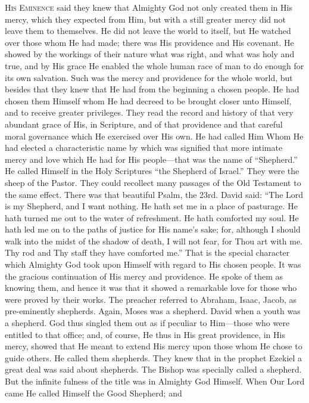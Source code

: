 H\textsc{is} E\textsc{minence}
said they knew that Almighty God not only created them in His mercy,
which they expected from Him, but with a still greater mercy did not
leave them to themselves. He did not leave the world to itself, but He
watched over those whom He had made; there was His providence and His
covenant. He showed by the workings of their nature what was right,
and what was holy and true, and by His grace He enabled the whole
human race of man to do enough for its own salvation. Such was the
mercy and providence for the whole world, but besides that they knew
that He had from the beginning a chosen people. He had chosen them
Himself whom He had decreed to be brought closer unto Himself, and to
receive greater privileges. They read the record and history of that
very abundant grace of His, in Scripture, and of that providence and
that careful moral governance which He exercised over His own. He had
called Him Whom He had elected a characteristic name by which was
signified that more intimate mercy and love which He had for His
people—that was the name of ``Shepherd.'' He called Himself in the
Holy Scriptures ``the Shepherd of Israel.'' They were the sheep of the
Pastor. They could recollect many passages of the Old Testament to the
same effect. There was that beautiful Psalm, the 23rd. David said: ``The
Lord is my Shepherd, and I want nothing. He hath set me in a place of
pasturage. He hath turned me out to the water of refreshment. He hath
comforted my soul. He hath led me on to the paths of justice for His
name's sake; for, although I should walk into the midst of the shadow
of death, I will not fear, for Thou art with me. Thy rod and Thy staff
they have comforted me.'' That is the special character which Almighty
God took upon Himself with regard to His chosen people. It was the
gracious continuation of His mercy and providence. He spoke of them as
knowing them, and hence it was that it showed a remarkable love for
those who were proved by their works. The preacher referred to
Abraham, Isaac, Jacob, as pre-eminently shepherds. Again, Moses was a
shepherd. David when a youth was a shepherd. God thus singled them out
as if peculiar to Him—those who were entitled to that office; and,
of course, He thus in His great providence, in His mercy, showed that
He meant to extend His mercy upon those whom He chose to guide others.
He called them shepherds. They knew that in the prophet Ezekiel a
great deal was said about shepherds. The Bishop was specially called a
shepherd. But the infinite fulness of the title was in Almighty God
Himself. When Our Lord came He called Himself the Good Shepherd; and
